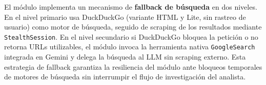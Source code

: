 El módulo implementa un mecanismo de \textbf{fallback de búsqueda} en dos
niveles. En el nivel primario usa DuckDuckGo (variante HTML y Lite,
sin rastreo de usuario) como motor de búsqueda, seguido de scraping
de los resultados mediante \texttt{StealthSession}. En el nivel secundario
si DuckDuckGo bloquea la petición o no retorna URLs utilizables,
el módulo invoca la herramienta nativa \texttt{GoogleSearch} integrada en
Gemini y delega la búsqueda al LLM sin scraping externo. Esta estrategia
de fallback garantiza la resiliencia del módulo ante bloqueos temporales
de motores de búsqueda sin interrumpir el flujo de investigación del analista.


